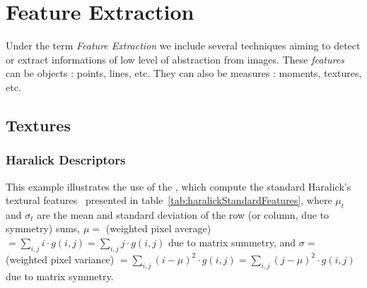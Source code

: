 \chapter{Feature Extraction}


Under the term {\em Feature Extraction} we include several techniques
aiming to detect or extract informations of low level of abstraction
from images. These {\em features} can be objects : points, lines,
etc. They can also be measures : moments, textures, etc.

\section{Textures}
\subsection{Haralick Descriptors}

This example illustrates the use of the ,
which compute the standard Haralick's textural features~\cite{Haralick1973} presented in table~\ref{tab:haralickStandardFeatures},
where $\mu_t$ and $\sigma_t$ are the mean and standard deviation of the row
(or column, due to symmetry) sums, $ \mu =  $ (weighted pixel average)
$ = \sum_{i,j}i \cdot g(i, j) =\sum_{i,j}j \cdot g(i, j) $ due to matrix summetry, and
$ \sigma =  $ (weighted pixel variance) $ = \sum_{i,j}(i - \mu)^2 \cdot g(i, j) =\sum_{i,j}(j - \mu)^2 \cdot g(i, j)  $
due to matrix symmetry.

